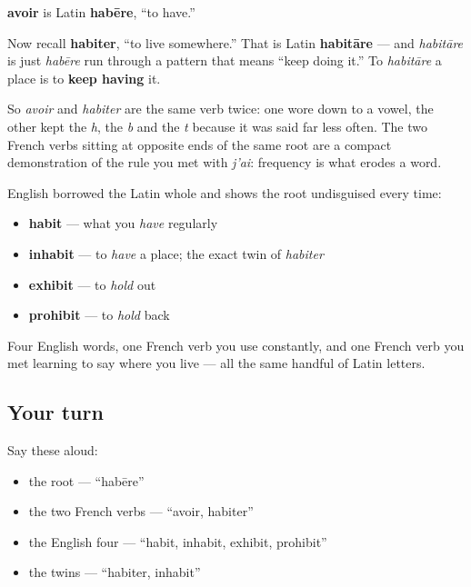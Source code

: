 \begin{cousinweb}
\textbf{avoir} is Latin \textbf{habēre}, \textquotedblleft{}to have.\textquotedblright{}

Now recall \textbf{habiter}, \textquotedblleft{}to live somewhere.\textquotedblright{} That is Latin \textbf{habitāre} — and \emph{habitāre} is just \emph{habēre} run through a pattern that means \textquotedblleft{}keep doing it.\textquotedblright{} To \emph{habitāre} a place is to \textbf{keep having} it.

So \emph{avoir} and \emph{habiter} are the same verb twice: one wore down to a vowel, the other kept the \emph{h}, the \emph{b} and the \emph{t} because it was said far less often. The two French verbs sitting at opposite ends of the same root are a compact demonstration of the rule you met with \emph{j'ai}: frequency is what erodes a word.

English borrowed the Latin whole and shows the root undisguised every time:

\begin{itemize}
\raggedright
  \item \textbf{habit} — what you \emph{have} regularly
  \item \textbf{inhabit} — to \emph{have} a place; the exact twin of \emph{habiter}
  \item \textbf{exhibit} — to \emph{hold} out
  \item \textbf{prohibit} — to \emph{hold} back
\end{itemize}

Four English words, one French verb you use constantly, and one French verb you met learning to say where you live — all the same handful of Latin letters.
\end{cousinweb}

\subsection*{Your turn}
Say these aloud:

\begin{itemize}
\raggedright
  \item the root — \textquotedblleft{}habēre\textquotedblright{}
  \item the two French verbs — \textquotedblleft{}avoir, habiter\textquotedblright{}
  \item the English four — \textquotedblleft{}habit, inhabit, exhibit, prohibit\textquotedblright{}
  \item the twins — \textquotedblleft{}habiter, inhabit\textquotedblright{}
\end{itemize}

